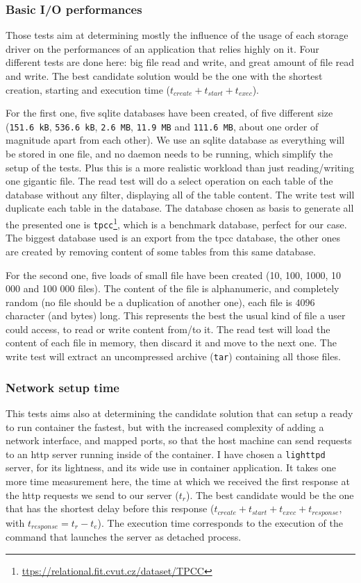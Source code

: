 \subsubsection{Basic I/O performances}
Those tests aim at determining mostly the influence of the usage of each storage driver on the performances of an application that relies highly on it.  Four different tests are done here: big file read and write, and great amount of file read and write.  The best candidate solution would be the one with the shortest creation, starting and execution time ($t_{create} + t_{start} + t_{exec}$).

For the first one, five sqlite databases have been created, of five different size (\texttt{151.6 kB}, \texttt{536.6 kB}, \texttt{2.6 MB}, \texttt{11.9 MB} and \texttt{111.6 MB}, about one order of magnitude apart from each other).  We use an sqlite database as everything will be stored in one file, and no daemon needs to be running, which simplify the setup of the tests.  Plus this is a more realistic workload than just reading/writing one gigantic file.
The read test will do a select operation on each table of the database without any filter, displaying all of the table content.  The write test will duplicate each table in the database.  The database chosen as basis to generate all the presented one is \texttt{tpcc}\footnote{\href{https://relational.fit.cvut.cz/dataset/TPCC}{ttps://relational.fit.cvut.cz/dataset/TPCC}}, which is a benchmark database, perfect for our case.  The biggest database used is an export from the tpcc database, the other ones are created by removing content of some tables from this same database.

For the second one, five loads of small file have been created (10, 100, 1000, 10 000 and 100 000 files).  The content of the file is alphanumeric, and completely random (no file should be a duplication of another one), each file is $4096$ character (and bytes) long.  This represents the best the usual kind of file a user could access, to read or write content from/to it. 
The read test will load the content of each file in memory, then discard it and move to the next one.  The write test will extract an uncompressed archive (\texttt{tar}) containing all those files.

\subsubsection{Network setup time}
This tests aims also at determining the candidate solution that can setup a ready to run container the fastest, but with the increased complexity of adding a network interface, and mapped ports, so that the host machine can send requests to an http server running inside of the container.  I have chosen a \texttt{lighttpd} server, for its lightness, and its wide use in container application.  It takes one more time measurement here, the time at which we received the first response at the http requests we send to our server ($t_r$).  The best candidate would be the one that has the shortest delay before this response ($t_{create} + t_{start} + t_{exec} + t_{response}$, with $t_{response}=t_r - t_e$).  The execution time corresponds to the execution of the command that launches the server as detached process.


